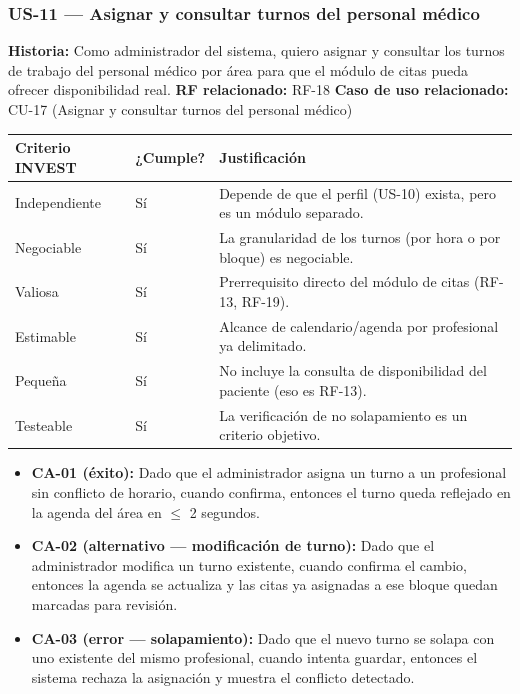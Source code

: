 \documentclass[11pt,a4paper]{article}
\providecommand{\tightlist}{%
	\setlength{\itemsep}{0pt}\setlength{\parskip}{0pt}}
\begin{document}
	\subsubsection{US-11 --- Asignar y consultar turnos del personal médico}
	
	\textbf{Historia:} Como administrador del sistema, quiero asignar y consultar los turnos de trabajo del personal médico por área para que el módulo de citas pueda ofrecer disponibilidad real.
	\textbf{RF relacionado:} RF-18
	\textbf{Caso de uso relacionado:} CU-17 (Asignar y consultar turnos del personal médico)
	
	\begin{longtable}{p{} p{} p{}}
		
		
		\toprule
		\textbf{Criterio INVEST} &
		\textbf{¿Cumple?} &
		\textbf{Justificación} \\
		\midrule
		\endhead
		
		Independiente & Sí & Depende de que el perfil (US-10) exista, pero es un módulo separado. \\
		Negociable & Sí & La granularidad de los turnos (por hora o por bloque) es negociable. \\
		Valiosa & Sí & Prerrequisito directo del módulo de citas (RF-13, RF-19). \\
		Estimable & Sí & Alcance de calendario/agenda por profesional ya delimitado. \\
		Pequeña & Sí & No incluye la consulta de disponibilidad del paciente (eso es RF-13). \\
		Testeable & Sí & La verificación de no solapamiento es un criterio objetivo. \\
		
		\bottomrule
		
	\end{longtable}
	
	\begin{itemize}
		\tightlist
		\item
		\textbf{CA-01 (éxito):} Dado que el administrador asigna un turno a un profesional sin conflicto de horario, cuando confirma, entonces el turno queda reflejado en la agenda del área en \(\leq\) 2 segundos.
		\item
		\textbf{CA-02 (alternativo --- modificación de turno):} Dado que el administrador modifica un turno existente, cuando confirma el cambio, entonces la agenda se actualiza y las citas ya asignadas a ese bloque quedan marcadas para revisión.
		\item
		\textbf{CA-03 (error --- solapamiento):} Dado que el nuevo turno se solapa con uno existente del mismo profesional, cuando intenta guardar, entonces el sistema rechaza la asignación y muestra el conflicto detectado.
	\end{itemize}
	
\end{document}
